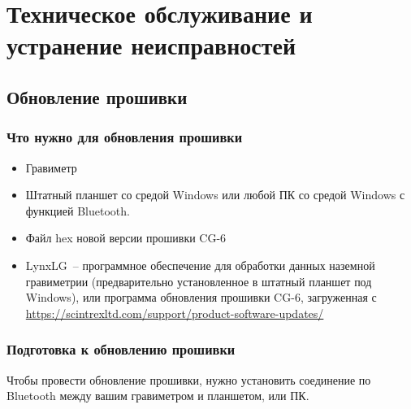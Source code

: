 \chapter[Техническое обслуживание]{Техническое обслуживание и устранение неисправностей}
\label{chap:maintenance_and_troubleshooting}

\section{Обновление прошивки}


\subsection{Что нужно для обновления прошивки}

\begin{itemize}
  \item Гравиметр \cg{}

  \item Штатный планшет со средой Windows или любой ПК со средой Windows с
    функцией Bluetooth.

  \item Файл hex новой версии прошивки CG-6

  \item LynxLG~-- программное обеспечение для обработки данных наземной
    гравиметрии (предварительно установленное в штатный планшет под Windows),
    или программа обновления прошивки CG-6,
    загруженная с
    \url{https://scintrexltd.com/support/product-software-updates/}
\end{itemize}

\subsection{Подготовка к обновлению прошивки}
\label{subsec:preparing_to_upgrade_your_firmware}

Чтобы провести обновление прошивки, нужно установить
соединение по Bluetooth между вашим гравиметром \cg{} и планшетом, или ПК.


